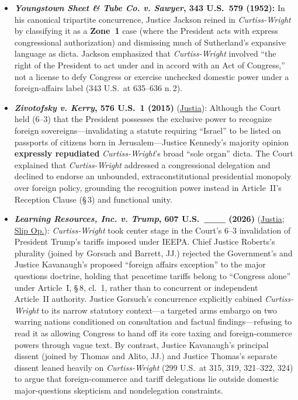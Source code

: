\documentclass[12pt]{article}
\begin{document}
\begin{itemize}

\item \textbf{\textit{Youngstown Sheet \& Tube Co. v. Sawyer}, 343 U.S.\ 579 (1952):} In his canonical tripartite concurrence, Justice Jackson reined in \textit{Curtiss-Wright} by classifying it as a \textbf{Zone~1} case (where the President acts with express congressional authorization) and dismissing much of Sutherland's expansive language as dicta. Jackson emphasized that \textit{Curtiss-Wright} involved ``the right of the President to act under and in accord with an Act of Congress,'' not a license to defy Congress or exercise unchecked domestic power under a foreign-affairs label (343 U.S.\ at 635--636 n.\,2).

\item \textbf{\textit{Zivotofsky v. Kerry}, 576 U.S.\ 1 (2015)} (\href{https://supreme.justia.com/cases/federal/us/576/1/}{Justia}): Although the Court held (6--3) that the President possesses the exclusive power to recognize foreign sovereigns---invalidating a statute requiring ``Israel'' to be listed on passports of citizens born in Jerusalem---Justice Kennedy's majority opinion \textbf{expressly repudiated} \textit{Curtiss-Wright}'s broad ``sole organ'' dicta. The Court explained that \textit{Curtiss-Wright} addressed a congressional delegation and declined to endorse an unbounded, extraconstitutional presidential monopoly over foreign policy, grounding the recognition power instead in Article~II's Reception Clause (\S\,3) and functional unity.

\item \textbf{\textit{Learning Resources, Inc. v. Trump}, 607 U.S.\ \_\_\_ (2026)} (\href{https://supreme.justia.com/cases/federal/us/607/24-1287/}{Justia}; \href{https://www.supremecourt.gov/opinions/25pdf/24-1287_4gcj.pdf}{Slip Op.}): \textit{Curtiss-Wright} took center stage in the Court's 6--3 invalidation of President Trump's tariffs imposed under IEEPA. Chief Justice Roberts's plurality (joined by Gorsuch and Barrett, JJ.) rejected the Government's and Justice Kavanaugh's proposed ``foreign affairs exception'' to the major questions doctrine, holding that peacetime tariffs belong to ``Congress alone'' under Article~I, \S\,8, cl.\ 1, rather than to concurrent or independent Article~II authority. Justice Gorsuch's concurrence explicitly cabined \textit{Curtiss-Wright} to its narrow statutory context---a targeted arms embargo on two warring nations conditioned on consultation and factual findings---refusing to read it as allowing Congress to hand off its core taxing and foreign-commerce powers through vague text. By contrast, Justice Kavanaugh's principal dissent (joined by Thomas and Alito, JJ.) and Justice Thomas's separate dissent leaned heavily on \textit{Curtiss-Wright} (299 U.S.\ at 315, 319, 321--322, 324) to argue that foreign-commerce and tariff delegations lie outside domestic major-questions skepticism and nondelegation constraints.

\end{itemize}
\end{document}
